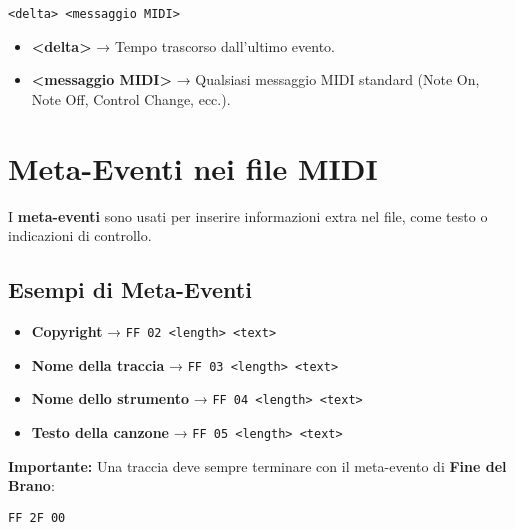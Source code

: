 \begin{verbatim}
<delta> <messaggio MIDI>
\end{verbatim}

\begin{itemize}
    \item \textbf{\textless{}delta\textgreater{}} → Tempo trascorso dall'ultimo evento.
    \item \textbf{\textless{}messaggio MIDI\textgreater{}} → Qualsiasi messaggio MIDI standard (Note On, Note Off, Control Change, ecc.).
\end{itemize}

\section*{Meta-Eventi nei file MIDI}

I \textbf{meta-eventi} sono usati per inserire informazioni extra nel file, come testo o indicazioni di controllo.

\subsection*{Esempi di Meta-Eventi}

\begin{itemize}
    \item \textbf{Copyright} → \texttt{FF 02 <length> <text>}
    \item \textbf{Nome della traccia} → \texttt{FF 03 <length> <text>}
    \item \textbf{Nome dello strumento} → \texttt{FF 04 <length> <text>}
    \item \textbf{Testo della canzone} → \texttt{FF 05 <length> <text>}
\end{itemize}

\textbf{Importante:} Una traccia deve sempre terminare con il meta-evento di \textbf{Fine del Brano}:

\begin{verbatim}
FF 2F 00
\end{verbatim}
